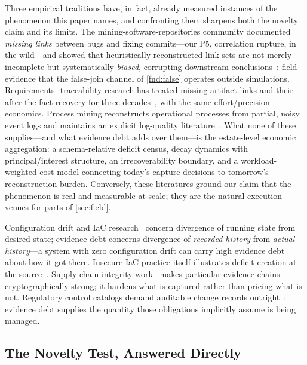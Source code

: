 Three empirical traditions have, in fact, already measured instances of the
phenomenon this paper names, and confronting them sharpens both the novelty claim
and its limits. The mining-software-repositories community documented
\emph{missing links} between bugs and fixing commits---our P5, correlation
rupture, in the wild---and showed that heuristically reconstructed link sets are
not merely incomplete but systematically \emph{biased}, corrupting downstream
conclusions~\cite{bachmann2010,bird2009}: field evidence that the false-join
channel of \cref{fnd:false} operates outside simulations. Requirements-%
traceability research has treated missing artifact links and their after-the-fact
recovery for three decades~\cite{gotel1994,antoniol2002}, with the same
effort/precision economics. Process mining reconstructs operational processes
from partial, noisy event logs and maintains an explicit log-quality
literature~\cite{aalst2016}. What none of these supplies---and what evidence debt
adds over them---is the estate-level economic aggregation: a schema-relative
deficit census, decay dynamics with principal/interest structure, an
irrecoverability boundary, and a workload-weighted cost model connecting today's
capture decisions to tomorrow's reconstruction burden. Conversely, these
literatures ground our claim that the phenomenon is real and measurable at
scale; they are the natural execution venues for parts of \cref{sec:field}.

Configuration drift and IaC research~\cite{rahman2019mapping,beetz2022,
opengitops} concern divergence of running state from desired state; evidence debt
concerns divergence of \emph{recorded history} from \emph{actual history}---a
system with zero configuration drift can carry high evidence debt about how
it got there. Insecure IaC practice itself illustrates deficit creation at the
source~\cite{rahman2019}. Supply-chain integrity work~\cite{torres2019,slsa}
makes particular evidence chains cryptographically strong; it hardens what is
captured rather than pricing what is not. Regulatory control catalogs demand
auditable change records outright~\cite{nist80053,sox2002}; evidence debt supplies
the quantity those obligations implicitly assume is being managed.

\subsection{The Novelty Test, Answered Directly}
\label{sec:novelty}


